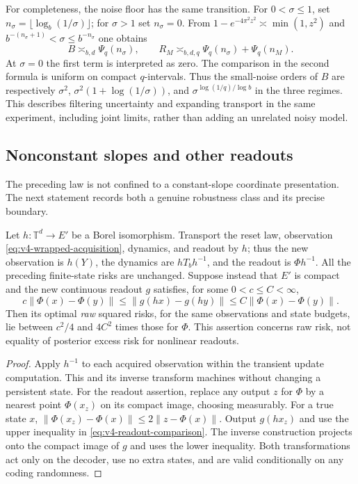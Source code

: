 For completeness, the noise floor has the same transition. For
$0<\sigma\le1$, set
$n_\sigma=\lfloor\log_b(1/\sigma)\rfloor$; for $\sigma>1$ set
$n_\sigma=0$. From $1-e^{-4\pi^2z^2}\asymp\min(1,z^2)$ and
$b^{-(n_\sigma+1)}<\sigma\le b^{-n_\sigma}$ one obtains
\begin{equation}
 B\asymp_{b,d}\Psi_q(n_\sigma),\qquad
 R_M\asymp_{b,d,q} \Psi_q(n_\sigma)+\Psi_q(n_M).                 \label{eq:v4-joint-profile}
\end{equation}
At $\sigma=0$ the first term is interpreted as zero. The comparison
in the second formula is uniform on compact $q$-intervals. Thus the
small-noise orders of $B$ are respectively $\sigma^2$,
$\sigma^2(1+\log(1/\sigma))$, and
$\sigma^{\log(1/q)/\log b}$ in the three regimes. This describes
filtering uncertainty and expanding transport in the same experiment,
including joint limits, rather than adding an unrelated noisy model.

\subsection{Nonconstant slopes and other readouts}
The preceding law is not confined to a constant-slope coordinate
presentation. The next statement records both a genuine robustness
class and its precise boundary.

\begin{proposition}\label{prop:v4-conjugacy}
Let $h:\mathbb T^d\to E'$ be a Borel isomorphism. Transport the reset
law, observation \eqref{eq:v4-wrapped-acquisition}, dynamics, and
readout by $h$; thus the new observation is $h(Y)$, the dynamics are
$hT_bh^{-1}$, and the readout is $\Phi h^{-1}$. All the preceding
finite-state risks are unchanged.
Suppose instead that $E'$ is compact and the new continuous readout
$g$ satisfies, for some $0<c\le C<\infty$,
\begin{equation}
 c\|\Phi(x)-\Phi(y)\|
 \le\|g(hx)-g(hy)\|
 \le C\|\Phi(x)-\Phi(y)\|.                                    \label{eq:v4-readout-comparison}
\end{equation}
Then its optimal \emph{raw} squared risks, for the same observations
and state budgets, lie between $c^2/4$ and $4C^2$ times those for
$\Phi$. This assertion concerns raw risk, not equality of posterior
excess risk for nonlinear readouts.
\end{proposition}
\begin{proof}
Apply $h^{-1}$ to each acquired observation within the transient
update computation. This and its inverse transform machines without
changing a persistent state. For the readout assertion, replace any
output $z$ for $\Phi$ by a nearest point $\Phi(x_z)$ on its compact
image, choosing measurably. For a true state $x$,
$\|\Phi(x_z)-\Phi(x)\|\le2\|z-\Phi(x)\|$.
Output $g(hx_z)$ and use the upper inequality in
\eqref{eq:v4-readout-comparison}. The inverse construction projects
onto the compact image of $g$ and uses the lower inequality.
Both transformations act only on the decoder, use no extra states,
and are valid conditionally on any coding randomness.
\end{proof}

